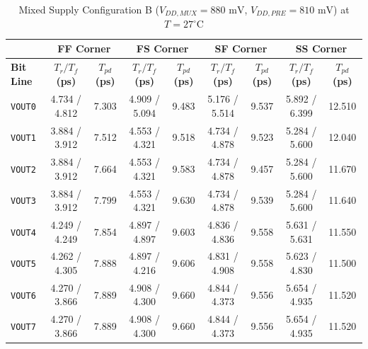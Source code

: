 \begin{table}[H]
    \centering
    \renewcommand{\arraystretch}{1.3}
    \setlength{\tabcolsep}{4pt}
    \small
    \begin{tabular}{|l|cc|cc|cc|cc|}
        \hline
        & \multicolumn{2}{c|}{\textbf{FF Corner}} & \multicolumn{2}{c|}{\textbf{FS Corner}} & \multicolumn{2}{c|}{\textbf{SF Corner}} & \multicolumn{2}{c|}{\textbf{SS Corner}} \\ \hline
        \textbf{Bit Line} & \textbf{$T_r / T_f$ (ps)} & \textbf{$T_{pd}$ (ps)} & \textbf{$T_r / T_f$ (ps)} & \textbf{$T_{pd}$ (ps)} & \textbf{$T_r / T_f$ (ps)} & \textbf{$T_{pd}$ (ps)} & \textbf{$T_r / T_f$ (ps)} & \textbf{$T_{pd}$ (ps)} \\ \hline
        \texttt{VOUT0} & 4.734 / 4.812 & 7.303 & 4.909 / 5.094 & 9.483 & 5.176 / 5.514 & 9.537 & 5.892 / 6.399 & 12.510 \\ 
        \texttt{VOUT1} & 3.884 / 3.912 & 7.512 & 4.553 / 4.321 & 9.518 & 4.734 / 4.878 & 9.523 & 5.284 / 5.600 & 12.040 \\ 
        \texttt{VOUT2} & 3.884 / 3.912 & 7.664 & 4.553 / 4.321 & 9.583 & 4.734 / 4.878 & 9.457 & 5.284 / 5.600 & 11.670 \\ 
        \texttt{VOUT3} & 3.884 / 3.912 & 7.799 & 4.553 / 4.321 & 9.630 & 4.734 / 4.878 & 9.539 & 5.284 / 5.600 & 11.640 \\ 
        \texttt{VOUT4} & 4.249 / 4.249 & 7.854 & 4.897 / 4.897 & 9.603 & 4.836 / 4.836 & 9.558 & 5.631 / 5.631 & 11.550 \\ 
        \texttt{VOUT5} & 4.262 / 4.305 & 7.888 & 4.897 / 4.216 & 9.606 & 4.831 / 4.908 & 9.558 & 5.623 / 4.830 & 11.500 \\ 
        \texttt{VOUT6} & 4.270 / 3.866 & 7.889 & 4.908 / 4.300 & 9.660 & 4.844 / 4.373 & 9.556 & 5.654 / 4.935 & 11.520 \\ 
        \texttt{VOUT7} & 4.270 / 3.866 & 7.889 & 4.908 / 4.300 & 9.660 & 4.844 / 4.373 & 9.556 & 5.654 / 4.935 & 11.520 \\ \hline
    \end{tabular}
    \vspace{2mm}
    \caption{Mixed Supply Configuration B ($V_{DD,MUX} = 880\text{ mV}$, $V_{DD,PRE} = 810\text{ mV}$) at $T = 27^{\circ}\text{C}$}
    \label{tab:asym_b_27}
\end{table}

